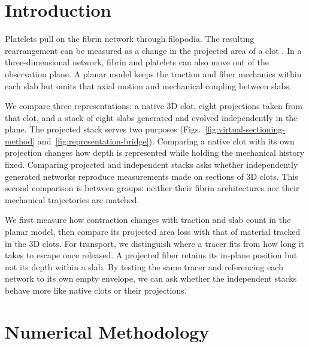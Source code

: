 \documentclass[twocolumn, 10pt]{article}
\begin{document}
\section{Introduction}
Platelets pull on the fibrin network through filopodia. The resulting rearrangement can be measured as a change in the projected area of a clot \cite{Michael2023,Prakhya2022}. In a three-dimensional network, fibrin and platelets can also move out of the observation plane. A planar model keeps the traction and fiber mechanics within each slab but omits that axial motion and mechanical coupling between slabs.

We compare three representations: a native 3D clot, eight projections taken from that clot, and a stack of eight slabs generated and evolved independently in the plane. The projected stack serves two purposes (Figs.~\ref{fig:virtual-sectioning-method} and~\ref{fig:representation-bridge}). Comparing a native clot with its own projection changes how depth is represented while holding the mechanical history fixed. Comparing projected and independent stacks asks whether independently generated networks reproduce measurements made on sections of 3D clots. This second comparison is between groups: neither their fibrin architectures nor their mechanical trajectories are matched.

We first measure how contraction changes with traction and slab count in the planar model, then compare its projected area loss with that of material tracked in the 3D clots. For transport, we distinguish where a tracer fits from how long it takes to escape once released. A projected fiber retains its in-plane position but not its depth within a slab. By testing the same tracer and referencing each network to its own empty envelope, we can ask whether the independent stacks behave more like native clots or their projections.

\section{Numerical Methodology}
\end{document}
